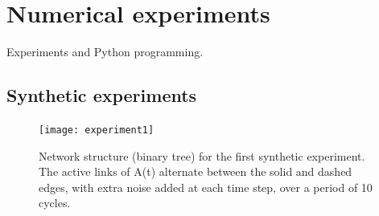 \chapter{Numerical experiments}
\label{chap:expe}

Experiments and Python programming.

\section{Synthetic experiments}
\label{sec:synexp}

\begin{figure}[h]\centering
    \texttt{[image: experiment1]}
    \caption{Network structure (binary tree) for the first synthetic experiment. The active links of A(t) alternate between the solid and dashed edges, with extra noise added at each time step, over a period of 10 cycles.}
    \label{fig:exp1}
    \bigskip
\end{figure}

